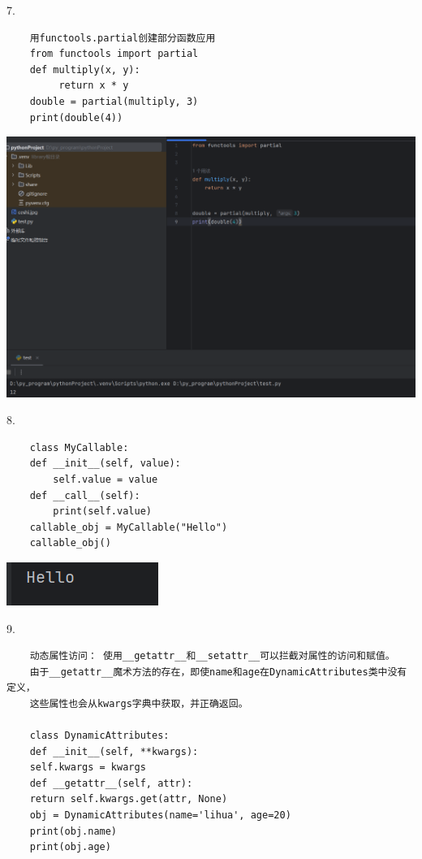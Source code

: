 \documentclass{article}
\begin{document}
7.\begin{verbatim}
    用functools.partial创建部分函数应用
    from functools import partial
    def multiply(x, y):
         return x * y
    double = partial(multiply, 3)
    print(double(4))
  \end{verbatim}

\noindent
\begin{minipage}{\linewidth}
 \centering
  \includegraphics[width=0.5\linewidth]{t7.png}
  \label{fig:example}
\end{minipage}

8.
\begin{verbatim}
    class MyCallable:
    def __init__(self, value):
        self.value = value
    def __call__(self):
        print(self.value)
    callable_obj = MyCallable("Hello")
    callable_obj()
\end{verbatim}

\noindent
\begin{minipage}{\linewidth}
 \centering
  \includegraphics[width=0.5\linewidth]{t8.png}
  \label{fig:example}
\end{minipage}

9.
\begin{verbatim}
	动态属性访问： 使用__getattr__和__setattr__可以拦截对属性的访问和赋值。
	由于__getattr__魔术方法的存在，即使name和age在DynamicAttributes类中没有定义，
	这些属性也会从kwargs字典中获取，并正确返回。
	
	class DynamicAttributes:
	def __init__(self, **kwargs):
	self.kwargs = kwargs
	def __getattr__(self, attr):
	return self.kwargs.get(attr, None)
	obj = DynamicAttributes(name='lihua', age=20)
	print(obj.name)  
	print(obj.age)   
\end{verbatim}
\end{document}
